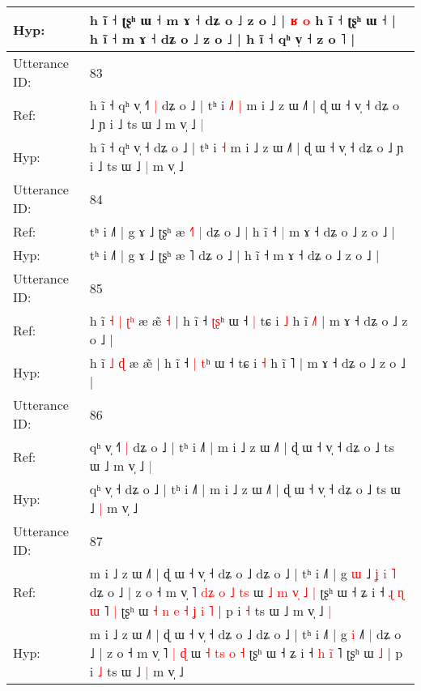 \documentclass[10pt]{article}
\DeclareRobustCommand{\hl}[1]{{\textcolor{red}{#1}}}
\begin{document}
\begin{longtable}{ll}
Hyp: & h ĩ ˧ ʈʂʰ ɯ ˧\hl{}\hl{} m ɤ ˧ dʑ o ˩ z o ˩ |\hl{ }\hl{ʁ}\hl{ }\hl{o} h ĩ ˧ ʈʂʰ ɯ ˧ | h ĩ ˧\hl{}\hl{} m ɤ ˧ dʑ o ˩ z o ˩ | h ĩ ˧ qʰ v̩ ˧ z o ˥ |
 \\
\midrule
Utterance ID: & 83 \\
Ref: & h ĩ ˧ qʰ v̩ ˧\hl{˥}\hl{ }\hl{|} dʑ o ˩ | tʰ i\hl{ }\hl{˩}\hl{˥} \hl{|} m i ˩ z ɯ ˩˥ | ɖ ɯ ˧ v̩ ˧ dʑ o ˩ ɲ i ˩ ts ɯ ˩\hl{}\hl{} m v̩ ˩\hl{ }\hl{|}
 \\
Hyp: & h ĩ ˧ qʰ v̩ ˧\hl{}\hl{}\hl{} dʑ o ˩ | tʰ i\hl{}\hl{}\hl{} \hl{˧} m i ˩ z ɯ ˩˥ | ɖ ɯ ˧ v̩ ˧ dʑ o ˩ ɲ i ˩ ts ɯ ˩\hl{ }\hl{|} m v̩ ˩\hl{}\hl{}
 \\
\midrule
Utterance ID: & 84 \\
Ref: & tʰ i ˩˥ | g ɤ ˩ ʈʂʰ æ \hl{˧}˥\hl{ }\hl{|} dʑ o ˩ | h ĩ ˧\hl{ }\hl{|} m ɤ ˧ dʑ o ˩ z o ˩ |
 \\
Hyp: & tʰ i ˩˥ | g ɤ ˩ ʈʂʰ æ \hl{}˥\hl{}\hl{} dʑ o ˩ | h ĩ ˧\hl{}\hl{} m ɤ ˧ dʑ o ˩ z o ˩ |
 \\
\midrule
Utterance ID: & 85 \\
Ref: & h ĩ\hl{ }\hl{˧} \hl{|} \hl{ʈ}\hl{ʰ} æ æ̃\hl{ }\hl{˧} | h ĩ ˧ \hl{}\hl{ʈ}\hl{ʂ}ʰ ɯ ˧\hl{ }\hl{|} tɕ i \hl{˩} h ĩ \hl{˩}˥ | m ɤ ˧ dʑ o ˩ z o ˩ |
 \\
Hyp: & h ĩ\hl{}\hl{} \hl{˩} \hl{}\hl{ɖ} æ æ̃\hl{}\hl{} | h ĩ ˧ \hl{|}\hl{ }\hl{t}ʰ ɯ ˧\hl{}\hl{} tɕ i \hl{˧} h ĩ \hl{}˥ | m ɤ ˧ dʑ o ˩ z o ˩ |
 \\
\midrule
Utterance ID: & 86 \\
Ref: & qʰ v̩ ˧\hl{˥}\hl{ }\hl{|} dʑ o ˩ | tʰ i ˩˥ | m i ˩ z ɯ ˩˥ | ɖ ɯ ˧ v̩ ˧ dʑ o ˩ ts ɯ ˩\hl{}\hl{} m v̩ ˩\hl{ }\hl{|}
 \\
Hyp: & qʰ v̩ ˧\hl{}\hl{}\hl{} dʑ o ˩ | tʰ i ˩˥ | m i ˩ z ɯ ˩˥ | ɖ ɯ ˧ v̩ ˧ dʑ o ˩ ts ɯ ˩\hl{ }\hl{|} m v̩ ˩\hl{}\hl{}
 \\
\midrule
Utterance ID: & 87 \\
Ref: & m i ˩ z ɯ ˩˥ | ɖ ɯ ˧ v̩ ˧ dʑ o ˩ dʑ o ˩ | tʰ i ˩˥ | g \hl{ɯ} ˩\hl{ }\hl{ʝ}\hl{ }\hl{i} \hl{˥} dʑ o ˩ | z o ˧ m v̩ ˥\hl{ }\hl{d}\hl{ʑ}\hl{ }\hl{o} \hl{˩} \hl{t}\hl{s} ɯ\hl{ }\hl{˩} \hl{m} \hl{v}\hl{̩} \hl{˩} \hl{|} ʈʂʰ ɯ ˧ ʑ i ˧ \hl{ɻ} \hl{ɳ}\hl{ }\hl{ɯ} ˥\hl{ }\hl{|} ʈʂʰ ɯ\hl{ }\hl{˧}\hl{ }\hl{n}\hl{ }\hl{e}\hl{ }\hl{˧}\hl{ }\hl{ʝ}\hl{ }\hl{i} \hl{˥} | p i \hl{˧} ts ɯ ˩\hl{}\hl{} m v̩ ˩\hl{ }\hl{|}
 \\
Hyp: & m i ˩ z ɯ ˩˥ | ɖ ɯ ˧ v̩ ˧ dʑ o ˩ dʑ o ˩ | tʰ i ˩˥ | g \hl{i} ˩\hl{}\hl{}\hl{}\hl{˥} \hl{|} dʑ o ˩ | z o ˧ m v̩ ˥\hl{}\hl{}\hl{}\hl{}\hl{} \hl{|} \hl{}\hl{ɖ} ɯ\hl{}\hl{} \hl{˧} \hl{t}\hl{s} \hl{o} \hl{˧} ʈʂʰ ɯ ˧ ʑ i ˧ \hl{h} \hl{}\hl{i}\hl{̃} ˥\hl{}\hl{} ʈʂʰ ɯ\hl{}\hl{}\hl{}\hl{}\hl{}\hl{}\hl{}\hl{}\hl{}\hl{}\hl{}\hl{} \hl{˩} | p i \hl{˩} ts ɯ ˩\hl{ }\hl{|} m v̩ ˩\hl{}\hl{}

\end{longtable}
\end{document}
